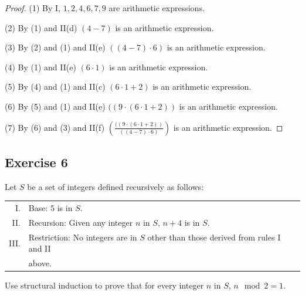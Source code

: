 \documentclass[14pt]{extarticle}
\newcommand{\dps}{\displaystyle}
\begin{document}
\begin{proof}
(1) By I, $1, 2, 4, 6, 7, 9$ are arithmetic expressions.

(2) By (1) and II(d) \((4 - 7)\) is an arithmetic expression.

(3) By (2) and (1) and II(e) \(((4 - 7) \cdot 6)\) is an arithmetic expression.

(4) By (1) and II(e) \((6 \cdot 1)\) is an arithmetic expression.

(5) By (4) and (1) and II(c) \((6 \cdot 1 + 2)\) is an arithmetic expression.

(6) By (5) and (1) and II(e) \(((9 \cdot (6 \cdot 1 + 2))\) is an arithmetic expression.

(7) By (6) and (3) and II(f) \(\dps \left( \frac{((9 \cdot (6 \cdot 1 + 2))}{((4 - 7) \cdot 6)}\right)\) is an
arithmetic expression.
\end{proof}

\subsection{Exercise 6}
Let $S$ be a set of integers defined recursively as follows:

\begin{tabular}{rl}
I. & Base: 5 is in $S$. \\
II. & Recursion: Given any integer $n$ in $S$, $n + 4$ is in $S$. \\
III. & Restriction: No integers are in $S$ other than those derived from rules I and II \\
     & above.
\end{tabular}

Use structural induction to prove that for every integer $n$ in $S$, $n \mod 2 = 1$.
\end{document}
